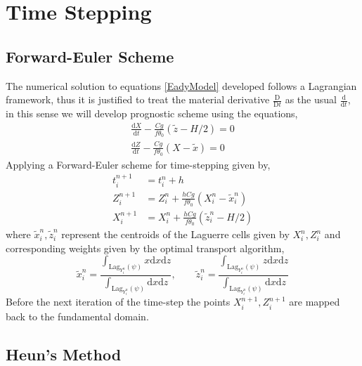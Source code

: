 \section{Time Stepping \label{timestep}}
\subsection{Forward-Euler Scheme}
The numerical solution to equations \ref{EadyModel} developed follows a Lagrangian framework, thus it is justified to treat the material derivative $\frac{\mathrm{D } }{\mathrm{D} t}$ as the usual $\frac{\mathrm{d }}{\mathrm{d} t}$, in this sense we will develop prognostic scheme using the equations,
	\begin{equation*}
	\begin{aligned}
	\frac{\mathrm{d}X}{\mathrm{d}t} -\frac{Cg}{f\theta _0}\left(\tilde{z}-H/2\right) = 0 \\
	\frac{\mathrm{d}Z}{\mathrm{d}t} - \frac{Cg}{f\theta_0}\left(X - \tilde{x}\right) = 0
	\end{aligned}
	\end{equation*}
Applying a Forward-Euler scheme for time-stepping given by,
\begin{equation}
	\begin{aligned}
	t_i^{n+1} &= t_i^n + h\\
	Z_i^{n+1} &= Z_i^n + \frac{hCg}{f\theta_0}\left(X_i^n-\tilde{x}_i^n\right)\\
	X_i^{n+1} &= X_i^n + \frac{hCg}{f\theta_0}\left(\tilde{z}_i^n-H/2\right)
	\end{aligned}
\end{equation}
where $\tilde{x}_i^n,\tilde{z}_i^n$ represent the centroids of the Laguerre cells given by $X_i^n,Z_i^n$ and corresponding weights given by the optimal transport algorithm,
\begin{equation}
	\tilde{x}_i^n = \frac{\int_{\mathrm{Lag}_{Y_i^n}(\psi)} x \mathrm{d}x \mathrm{d}z}{\int_{\mathrm{Lag}_{Y_i^n}(\psi)} \mathrm{d}x \mathrm{d}z}, \qquad
	\tilde{z}_i^n = \frac{\int_{\mathrm{Lag}_{Y_i^n}(\psi)} z \mathrm{d}x \mathrm{d}z}{\int_{\mathrm{Lag}_{Y_i^n}(\psi)} \mathrm{d}x \mathrm{d}z}
\end{equation}
Before the next iteration of the time-step the points $X_i^{n+1}, Z_i^{n+1}$ are mapped back to the fundamental domain.
\subsection{Heun's Method}

